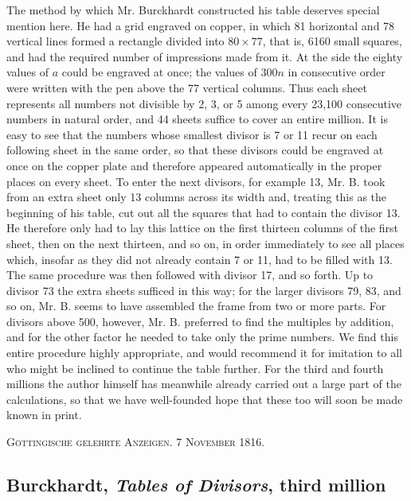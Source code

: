 \documentclass[12pt]{article}
\begin{document}
The method by which Mr. Burckhardt constructed his table deserves special mention here. He had a grid engraved on copper, in which 81 horizontal and 78 vertical lines formed a rectangle divided into $80\times77$, that is, 6160 small squares, and had the required number of impressions made from it. At the side the eighty values of $a$ could be engraved at once; the values of $300n$ in consecutive order were written with the pen above the 77 vertical columns. Thus each sheet represents all numbers not divisible by 2, 3, or 5 among every 23,100 consecutive numbers in natural order, and 44 sheets suffice to cover an entire million. It is easy to see that the numbers whose smallest divisor is 7 or 11 recur on each following sheet in the same order, so that these divisors could be engraved at once on the copper plate and therefore appeared automatically in the proper places on every sheet. To enter the next divisors, for example 13, Mr. B. took from an extra sheet only 13 columns across its width and, treating this as the beginning of his table, cut out all the squares that had to contain the divisor 13. He therefore only had to lay this lattice on the first thirteen columns of the first sheet, then on the next thirteen, and so on, in order immediately to see all places which, insofar as they did not already contain 7 or 11, had to be filled with 13. The same procedure was then followed with divisor 17, and so forth. Up to divisor 73 the extra sheets sufficed in this way; for the larger divisors 79, 83, and so on, Mr. B. seems to have assembled the frame from two or more parts. For divisors above 500, however, Mr. B. preferred to find the multiples by addition, and for the other factor he needed to take only the prime numbers. We find this entire procedure highly appropriate, and would recommend it for imitation to all who might be inclined to continue the table further. For the third and fourth millions the author himself has meanwhile already carried out a large part of the calculations, so that we have well-founded hope that these too will soon be made known in print.

\begin{center}
\textsc{Göttingische gelehrte Anzeigen. 7 November 1816.}
\end{center}

\subsection*{Burckhardt, \textit{Tables of Divisors}, third million}
\end{document}
